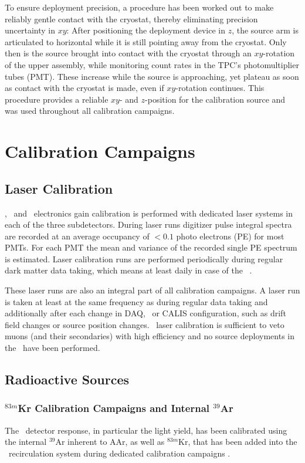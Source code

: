 To ensure deployment precision, a procedure has been worked out to make reliably gentle contact with the cryostat, thereby eliminating precision uncertainty in $xy$: After positioning the deployment device in $z$, the source arm is articulated to horizontal while it is still pointing away from the cryostat. Only then is the source brought into contact with the cryostat through an $xy$-rotation of the upper assembly, while monitoring count rates in the TPC's photomultiplier tubes (PMT).  These increase while the source is approaching, yet plateau as soon as contact with the cryostat is made, even if $xy$-rotation continues. This procedure provides a reliable $xy$- and $z$-position for the calibration source and was used throughout all calibration campaigns.


\section{Calibration Campaigns}\label{sec:CalibCampaigns}
\subsection{Laser Calibration}
\wcv, \lsv\ and \tpc\ electronics gain calibration is performed with dedicated laser systems in each of the three subdetectors. During laser runs digitizer pulse integral spectra are recorded at an average occupancy of $< 0.1$ photo electrons (PE) for most PMTs. For each PMT  the mean and variance of the recorded single PE spectrum is estimated. Laser calibration runs are performed periodically during regular dark matter data taking, which means at least daily in case of the \tpc\ \cite{Agnes:2015gu}. 

These laser runs are also an integral part of all calibration campaigns. A laser run is taken at least at the same frequency as during regular data taking and additionally after each change in DAQ, \tpc\ or CALIS configuration, such as drift field changes or source position changes. \wcv\ laser calibration is sufficient to veto muons (and their secondaries) with high efficiency and no source deployments in the \wcv\ have been performed.

\subsection{Radioactive Sources}
\subsubsection{$^{83m}$Kr Calibration Campaigns and Internal $^{39}$Ar}
The \tpc\ detector response, in particular the light yield, has been calibrated using the internal $^{39}$Ar inherent to AAr, as well as $^{83m}$Kr, that has been added into the \lar\ recirculation system during dedicated calibration campaigns \cite{Agnes:2015gu}.

